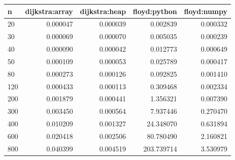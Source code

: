\begin{tabular}{lrrrr}
\hline
n & dijkstra:array & dijkstra:heap & floyd:python & floyd:numpy \\
\hline
20 & 0.000047 & 0.000039 & 0.002839 & 0.000332 \\
30 & 0.000069 & 0.000070 & 0.005035 & 0.000239 \\
40 & 0.000090 & 0.000042 & 0.012773 & 0.000649 \\
50 & 0.000109 & 0.000053 & 0.025789 & 0.000417 \\
80 & 0.000273 & 0.000126 & 0.092825 & 0.001410 \\
120 & 0.000433 & 0.000113 & 0.309468 & 0.002334 \\
200 & 0.001879 & 0.000441 & 1.356321 & 0.007390 \\
300 & 0.003450 & 0.000564 & 7.937446 & 0.270470 \\
400 & 0.010209 & 0.001327 & 24.348070 & 0.631894 \\
600 & 0.020418 & 0.002506 & 80.780490 & 2.160821 \\
800 & 0.040399 & 0.004519 & 203.739714 & 3.530979 \\
\hline
\end{tabular}
